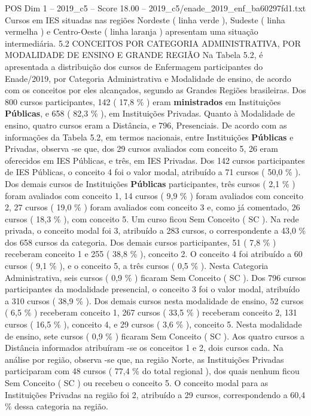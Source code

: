 \begin{textsample}{POS Dim 1 – 2019\_c5 – Score 18.00 – 2019\_c5/enade\_2019\_enf\_ba60297fd1.txt}
Cursos em IES situadas nas regiões Nordeste ( linha verde ), Sudeste ( linha vermelha ) e Centro-Oeste ( linha laranja ) apresentam uma situação intermediária. 5.2 CONCEITOS POR CATEGORIA ADMINISTRATIVA, POR MODALIDADE DE ENSINO E GRANDE REGIÃO Na Tabela 5.2, é apresentada a distribuição dos cursos de Enfermagem participantes do Enade/2019, por Categoria Administrativa e Modalidade de ensino, de acordo com os conceitos por eles alcançados, segundo as Grandes Regiões brasileiras.
Dos 800 cursos participantes, 142 ( 17,8 \% ) eram \textbf{ministrados} em Instituições \textbf{Públicas}, e 658 ( 82,3 \% ), em Instituições Privadas.
Quanto à Modalidade de ensino, quatro cursos eram a Distância, e 796, Presenciais.
De acordo com as informações da Tabela 5.2, em termos nacionais, entre Instituições \textbf{Públicas} e Privadas, observa -se que, dos 29 cursos avaliados com conceito 5, 26 eram oferecidos em IES Públicas, e três, em IES Privadas.
Dos 142 cursos participantes de IES Públicas, o conceito 4 foi o valor modal, atribuído a 71 cursos ( 50,0 \% ).
Dos demais cursos de Instituições \textbf{Públicas} participantes, três cursos ( 2,1 \% ) foram avaliados com conceito 1, 14 cursos ( 9,9 \% ) foram avaliados com conceito 2, 27 cursos ( 19,0 \% ) foram avaliados com conceito 3 e, como já comentado, 26 cursos ( 18,3 \% ), com conceito 5.
Um curso ficou Sem Conceito ( SC ).
Na rede privada, o conceito modal foi 3, atribuído a 283 cursos, o correspondente a 43,0 \% dos 658 cursos da categoria.
Dos demais cursos participantes, 51 ( 7,8 \% ) receberam conceito 1 e 255 ( 38,8 \% ), conceito 2.
O conceito 4 foi atribuído a 60 cursos ( 9,1 \% ), e o conceito 5, a três cursos ( 0,5 \% ).
Nesta Categoria Administrativa, seis cursos ( 0,9 \% ) ficaram Sem Conceito ( SC ).
Dos 796 cursos participantes da modalidade presencial, o conceito 3 foi o valor modal, atribuído a 310 cursos ( 38,9 \% ).
Dos demais cursos nesta modalidade de ensino, 52 cursos ( 6,5 \% ) receberam conceito 1, 267 cursos ( 33,5 \% ) receberam conceito 2, 131 cursos ( 16,5 \% ), conceito 4, e 29 cursos ( 3,6 \% ), conceito 5.
Nesta modalidade de ensino, sete cursos ( 0,9 \% ) ficaram Sem Conceito ( SC ).
Aos quatro cursos a Distância informados atribuíram -se os conceitos 1 e 2, dois cursos cada.
Na análise por região, observa -se que, na região Norte, as Instituições Privadas participaram com 48 cursos ( 77,4 \% do total regional ), dos quais nenhum ficou Sem Conceito ( SC ) ou recebeu o conceito 5.
O conceito modal para as Instituições Privadas na região foi 2, atribuído a 29 cursos, correspondendo a 60,4 \% dessa categoria na região.

\end{textsample}
